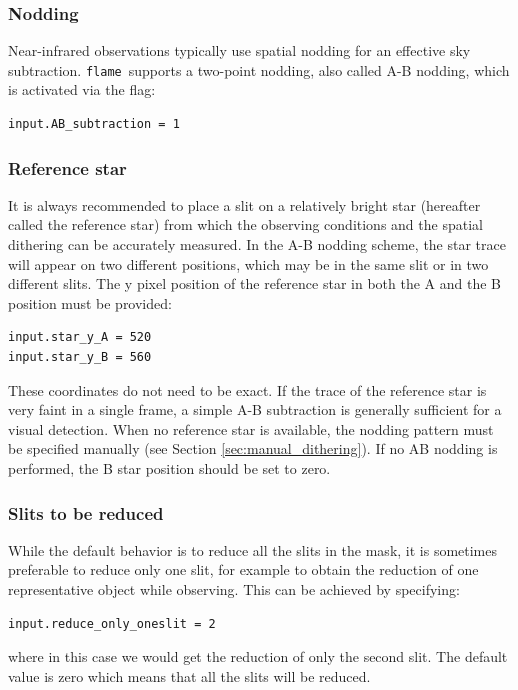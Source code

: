 \documentclass[a4paper]{article}
\newcommand{\flame}{\texttt{flame}}
\begin{document}
\subsubsection{Nodding}
Near-infrared observations typically use spatial nodding for an effective sky subtraction. \flame\ supports a two-point nodding, also called A-B nodding, which is activated via the flag:
\begin{lstlisting}
input.AB_subtraction = 1
\end{lstlisting}

\subsubsection{Reference star}
It is always recommended to place a slit on a relatively bright star (hereafter called the reference star) from which the observing conditions and the spatial dithering can be accurately measured. In the A-B nodding scheme, the star trace will appear on two different positions, which may be in the same slit or in two different slits. The y pixel position of the reference star in both the A and the B position must be provided:
\begin{lstlisting}
input.star_y_A = 520
input.star_y_B = 560
\end{lstlisting}
These coordinates do not need to be exact. If the trace of the reference star is very faint in a single frame, a simple A-B subtraction is generally sufficient for a visual detection. When no reference star is available, the nodding pattern must be specified manually (see Section \ref{sec:manual_dithering}). If no AB nodding is performed, the B star position should be set to zero.

\subsubsection{Slits to be reduced}
While the default behavior is to reduce all the slits in the mask, it is sometimes preferable to reduce only one slit, for example to obtain the reduction of one representative object while observing. This can be achieved by specifying:
\begin{lstlisting}
input.reduce_only_oneslit = 2
\end{lstlisting}
where in this case we would get the reduction of only the second slit. The default value is zero which means that all the slits will be reduced.
\end{document}
